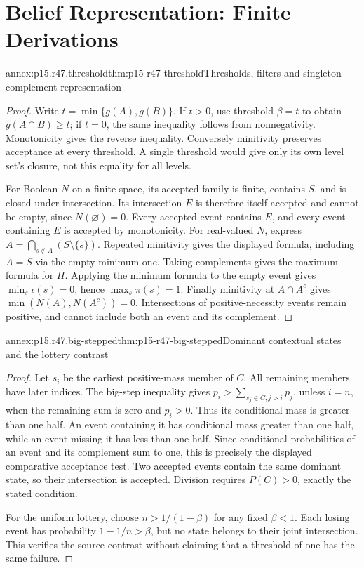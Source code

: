 \section{Belief Representation: Finite Derivations}
\label{sec:annex-p15-rationality-4-7}

\begin{annexitem}{annex:p15.r47.threshold}{thm:p15-r47-threshold}{Thresholds, filters and singleton-complement representation}
\begin{proof}
Write \(t=\min\{g(A),g(B)\}\). If \(t>0\), use threshold \(\beta=t\)
to obtain \(g(A\cap B)\geq t\); if \(t=0\), the same inequality follows
from nonnegativity. Monotonicity gives the reverse inequality. Conversely
minitivity preserves acceptance at every threshold. A single threshold
would give only its own level set's closure, not this equality for all levels.

For Boolean \(N\) on a finite space, its accepted family is finite,
contains \(S\), and is closed under intersection. Its intersection \(E\)
is therefore itself accepted and cannot be empty, since \(N(\varnothing)=0\).
Every accepted event contains \(E\), and every event containing \(E\)
is accepted by monotonicity. For real-valued \(N\), express
\(A=\bigcap_{s\notin A}(S\setminus\{s\})\). Repeated minitivity gives
the displayed formula, including \(A=S\) via the empty minimum one.
Taking complements gives the maximum formula for \(\Pi\). Applying
the minimum formula to the empty event gives \(\min_s\iota(s)=0\),
hence \(\max_s\pi(s)=1\). Finally minitivity at \(A\cap A^c\)
gives \(\min(N(A),N(A^c))=0\). Intersections of positive-necessity
events remain positive, and cannot include both an event and its complement.
\end{proof}\end{annexitem}

\begin{annexitem}{annex:p15.r47.big-stepped}{thm:p15-r47-big-stepped}{Dominant contextual states and the lottery contrast}
\begin{proof}
Let \(s_i\) be the earliest positive-mass member of \(C\). All remaining
members have later indices. The big-step inequality gives
\(p_i>\sum_{s_j\in C,j>i}p_j\), unless \(i=n\), when the remaining
sum is zero and \(p_i>0\). Thus its conditional mass is greater than
one half. An event containing it has conditional mass greater than one
half, while an event missing it has less than one half. Since conditional
probabilities of an event and its complement sum to one, this is precisely
the displayed comparative acceptance test. Two accepted events contain
the same dominant state, so their intersection is accepted. Division
requires \(P(C)>0\), exactly the stated condition.

For the uniform lottery, choose \(n>1/(1-\beta)\) for any fixed
\(\beta<1\). Each losing event has probability \(1-1/n>\beta\),
but no state belongs to their joint intersection. This verifies the source
contrast without claiming that a threshold of one has the same failure.
\end{proof}\end{annexitem}


